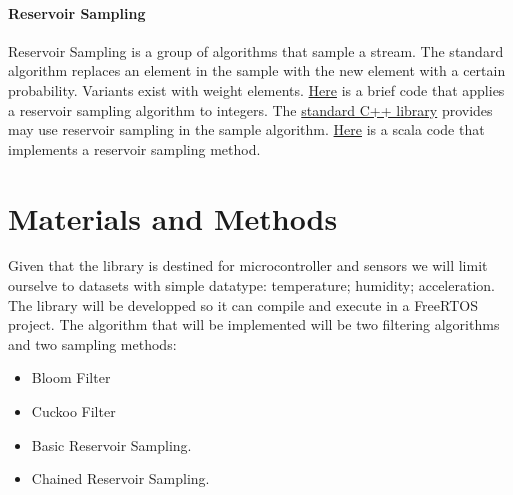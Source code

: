 \documentclass{article}
\begin{document}
\paragraph{Reservoir Sampling}
	Reservoir Sampling is a group of algorithms that sample a stream.
	The standard algorithm replaces an element in the sample with the new element with a certain probability.
	Variants exist with weight elements. 
	\href{https://www.geeksforgeeks.org/reservoir-sampling/}{Here} is a brief code that applies a reservoir sampling algorithm to integers.
	The \href{https://en.cppreference.com/w/cpp/algorithm/sample}{standard C++ library} provides may use reservoir sampling in the sample algorithm.
	\href{http://erikerlandson.github.io/blog/2015/11/20/very-fast-reservoir-sampling/}{Here} is a scala code that implements a reservoir sampling method.

\section{Materials and Methods}
Given that the library is destined for microcontroller and sensors we will limit ourselve to datasets
with simple datatype: temperature; humidity; acceleration.
The library will be developped so it can compile and execute in a FreeRTOS project.
The algorithm that will be implemented will be two filtering algorithms and two sampling methods:

\begin{itemize}
	\item Bloom Filter
	\item Cuckoo Filter
	\item Basic Reservoir Sampling.
	\item Chained Reservoir Sampling.
\end{itemize}
\end{document}
